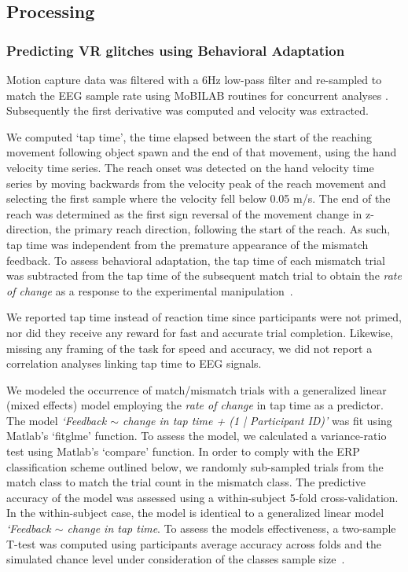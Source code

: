 \subsection{Processing}

\subsubsection{Predicting VR glitches using Behavioral Adaptation}

Motion capture data was filtered with a 6Hz low-pass filter and re-sampled to match the EEG sample rate using MoBILAB routines for concurrent analyses \cite{Ojeda2014-ev}. Subsequently the first derivative was computed and velocity was extracted. 

We computed `tap time', the time elapsed between the start of the reaching movement following object spawn and the end of that movement, using the hand velocity time series. The reach onset was detected on the hand velocity time series by moving backwards from the velocity peak of the reach movement and selecting the first sample where the velocity fell below 0.05 m/s. The end of the reach was determined as the first sign reversal of the movement change in z-direction, the primary reach direction, following the start of the reach. As such, tap time was independent from the premature appearance of the mismatch feedback. To assess behavioral adaptation, the tap time of each mismatch trial was subtracted from the tap time of the subsequent match trial to obtain the \textit{rate of change} as a response to the experimental manipulation~\cite{Dutilh2012-ps}.

We reported tap time instead of reaction time since participants were not primed, nor did they receive any reward for fast and accurate trial completion. Likewise, missing any framing of the task for speed and accuracy, we did not report a correlation analyses linking tap time to EEG signals.


We modeled the occurrence of match/mismatch trials with a generalized linear (mixed effects) model employing the \textit{rate of change} in tap time as a predictor. The model \textit{`Feedback $\sim$ change in tap time + (1 | Participant ID)'} was fit using Matlab's `fitglme' function. To assess the model, we calculated a variance-ratio test using Matlab's `compare' function. In order to comply with the ERP classification scheme outlined below, we randomly sub-sampled trials from the match class to match the trial count in the mismatch class. The predictive accuracy of the model was assessed using a within-subject 5-fold cross-validation. In the within-subject case, the model is identical to a generalized linear model \textit{`Feedback $\sim$ change in tap time}. To assess the models effectiveness, a two-sample T-test was computed using participants average accuracy across folds and the simulated chance level under consideration of the classes sample size~\cite{Muller-Putz2007-oc}.

